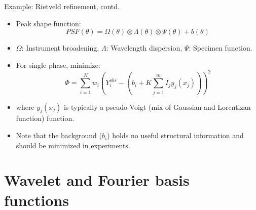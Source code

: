 \documentclass[aspectratio=169]{beamer}
\begin{document}
\begin{frame}{Example: Rietveld refinement, contd.}
    \begin{itemize}
        \item Peak shape function:
        \begin{equation*}
            PSF(\theta) = \Omega(\theta) \otimes \Lambda(\theta) \otimes \Psi(\theta) + b(\theta)
        \end{equation*}
        \item $\Omega$: Instrument broadening, $\Lambda$: Wavelength dispersion, $\Psi$: Specimen function.
        \item For single phase, minimize:
        \begin{equation*}
            \Phi = \sum_{i=1}^N w_i \left ( Y_i^{obs} - \left ( b_i + K \sum_{j=1}^m I_jy_j(x_j)\right )\right )^2
        \end{equation*}
        \item where $y_j(x_j)$ is typically a pseudo-Voigt (mix of Gaussian and Lorentizan function) function.
        \item Note that the background ($b_i$) holds no useful structural information and should be minimized in experiments.
    \end{itemize}
\end{frame} 



\section{Wavelet and Fourier basis functions}
\end{document}
